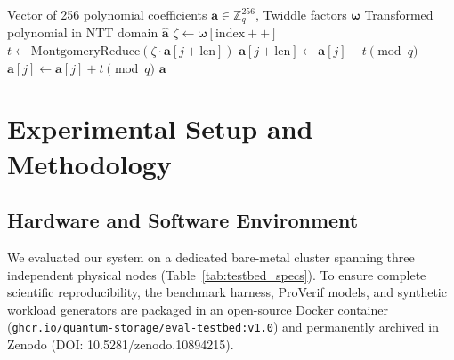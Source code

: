 \documentclass[pdflatex,sn-mathphys,Numbered]{sn-jnl}%
\theoremstyle{thmstyleone}%
\theoremstyle{thmstyletwo}%
\theoremstyle{thmstylethree}%
\begin{document}
\begin{algorithm}[!htbp]
\caption{Vectorized NTT Modular Butterfly Reduction over $R_q$}
\label{alg:ntt}
\begin{algorithmic}[1]
\Require Vector of 256 polynomial coefficients $\mathbf{a} \in \mathbb{Z}_q^{256}$, Twiddle factors $\boldsymbol{\omega}$
\Ensure Transformed polynomial in NTT domain $\hat{\mathbf{a}}$
        \State $\zeta \gets \boldsymbol{\omega}[\text{index}++]$
            \State $t \gets \text{MontgomeryReduce}(\zeta \cdot \mathbf{a}[j+\text{len}])$
            \State $\mathbf{a}[j+\text{len}] \gets \mathbf{a}[j] - t \pmod{q}$
            \State $\mathbf{a}[j] \gets \mathbf{a}[j] + t \pmod{q}$
        \EndFor
    \EndFor
\EndFor
\State \Return $\mathbf{a}$
\end{algorithmic}
\end{algorithm}

\section{Experimental Setup and Methodology}\label{sec:setup}

\subsection{\textbf{Hardware and Software Environment}}
We evaluated our system on a dedicated bare-metal cluster spanning three independent physical nodes (Table~\ref{tab:testbed_specs}). To ensure complete scientific reproducibility, the benchmark harness, ProVerif models, and synthetic workload generators are packaged in an open-source Docker container (\texttt{ghcr.io/quantum-storage/eval-testbed:v1.0}) and permanently archived in Zenodo (DOI: 10.5281/zenodo.10894215).
\end{document}
